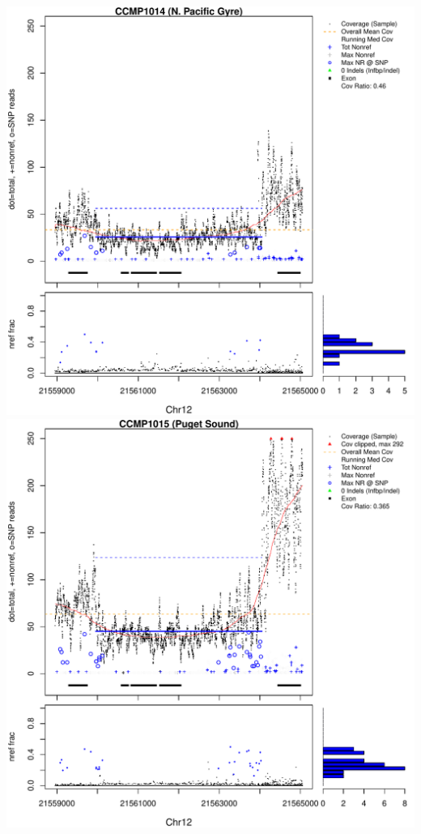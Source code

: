 \documentclass{article}\usepackage[]{graphicx}\usepackage[]{color}
\makeatletter
\def\maxwidth{ %
  \ifdim\Gin@nat@width>\linewidth
    \linewidth
  \else
    \Gin@nat@width
  \fi
}
\newenvironment{knitrout}{}{} %
\makeatother
\begin{document}
\begin{knitrout}
{\includegraphics[width=\maxwidth]{figs-knitr/unnamed-chunk-53-5} 
\includegraphics[width=\maxwidth]{figs-knitr/unnamed-chunk-53-6} 
}
\end{knitrout}
\end{document}
